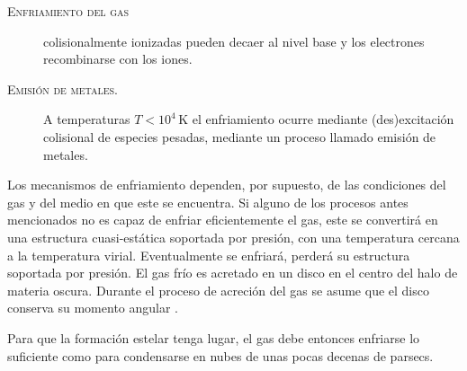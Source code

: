\documentclass[xcolor=dvipsnames,4pt,hyperref={colorlinks,citecolor=black,linkcolor=black,urlcolor=black}]{beamer}
\begin{document}
\begin{frame}[allowframebreaks]{\textsc{Enfriamiento del gas}}
\begin{description}
colisionalmente ionizadas pueden decaer al nivel base y los electrones recombinarse con los iones.
%
\item[\textsc{Emisión de metales.}] A temperaturas $T<10^4\,$K el enfriamiento ocurre mediante
(des)excitación colisional de especies pesadas, mediante un proceso llamado emisión de metales.
%
\end{description}
%
Los mecanismos de enfriamiento dependen, por supuesto, de las condiciones del gas y del medio en que
este se encuentra. Si alguno de los procesos antes mencionados no es capaz de enfriar eficientemente
el gas, este se convertirá en una estructura cuasi-estática soportada por presión, con una
temperatura cercana a la temperatura virial. Eventualmente se enfriará, perderá su estructura
soportada por presión. El gas frío es acretado en un disco en el centro del halo de materia oscura.
Durante el proceso de acreción del gas se asume que el disco conserva su momento angular
\citep[véase][]{White1991, Cole2000}.

Para que la formación estelar tenga lugar, el gas debe entonces enfriarse lo suficiente como para
condensarse en nubes de unas pocas decenas de parsecs.
%
\end{frame}
\end{document}
